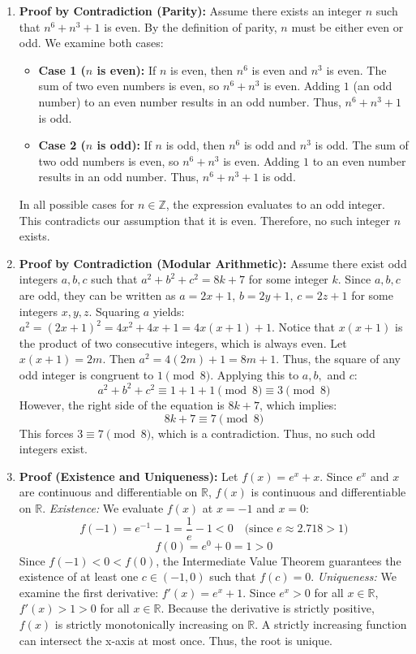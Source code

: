 \documentclass[11pt]{article}
\begin{document}
\begin{enumerate}
    \item \textbf{Proof by Contradiction (Parity):} Assume there exists an integer $n$ such that $n^6 + n^3 + 1$ is even. By the definition of parity, $n$ must be either even or odd. We examine both cases:
    \begin{itemize}
        \item \textbf{Case 1 ($n$ is even):} If $n$ is even, then $n^6$ is even and $n^3$ is even. The sum of two even numbers is even, so $n^6 + n^3$ is even. Adding $1$ (an odd number) to an even number results in an odd number. Thus, $n^6 + n^3 + 1$ is odd.
        \item \textbf{Case 2 ($n$ is odd):} If $n$ is odd, then $n^6$ is odd and $n^3$ is odd. The sum of two odd numbers is even, so $n^6 + n^3$ is even. Adding $1$ to an even number results in an odd number. Thus, $n^6 + n^3 + 1$ is odd.
    \end{itemize}
    In all possible cases for $n \in \mathbb{Z}$, the expression evaluates to an odd integer. This contradicts our assumption that it is even. Therefore, no such integer $n$ exists. \qedhere

    \item \textbf{Proof by Contradiction (Modular Arithmetic):} Assume there exist odd integers $a, b, c$ such that $a^2 + b^2 + c^2 = 8k + 7$ for some integer $k$. 
    Since $a, b, c$ are odd, they can be written as $a = 2x+1$, $b = 2y+1$, $c = 2z+1$ for some integers $x, y, z$. 
    Squaring $a$ yields: $a^2 = (2x+1)^2 = 4x^2 + 4x + 1 = 4x(x+1) + 1$. 
    Notice that $x(x+1)$ is the product of two consecutive integers, which is always even. Let $x(x+1) = 2m$. Then $a^2 = 4(2m) + 1 = 8m + 1$. Thus, the square of any odd integer is congruent to $1 \pmod 8$.
    Applying this to $a, b,$ and $c$:
    \[ a^2 + b^2 + c^2 \equiv 1 + 1 + 1 \pmod 8 \equiv 3 \pmod 8 \]
    However, the right side of the equation is $8k + 7$, which implies:
    \[ 8k + 7 \equiv 7 \pmod 8 \]
    This forces $3 \equiv 7 \pmod 8$, which is a contradiction. Thus, no such odd integers exist. \qedhere

    \item \textbf{Proof (Existence and Uniqueness):} Let $f(x) = e^x + x$. Since $e^x$ and $x$ are continuous and differentiable on $\mathbb{R}$, $f(x)$ is continuous and differentiable on $\mathbb{R}$.
    \textit{Existence:} We evaluate $f(x)$ at $x = -1$ and $x = 0$:
    \[ f(-1) = e^{-1} - 1 = \frac{1}{e} - 1 < 0 \quad \text{(since } e \approx 2.718 > 1 \text{)} \]
    \[ f(0) = e^0 + 0 = 1 > 0 \]
    Since $f(-1) < 0 < f(0)$, the Intermediate Value Theorem guarantees the existence of at least one $c \in (-1, 0)$ such that $f(c) = 0$.
    \textit{Uniqueness:} We examine the first derivative: $f'(x) = e^x + 1$. Since $e^x > 0$ for all $x \in \mathbb{R}$, $f'(x) > 1 > 0$ for all $x \in \mathbb{R}$. Because the derivative is strictly positive, $f(x)$ is strictly monotonically increasing on $\mathbb{R}$. A strictly increasing function can intersect the x-axis at most once. Thus, the root is unique. \qedhere


\end{enumerate}
\end{document}
